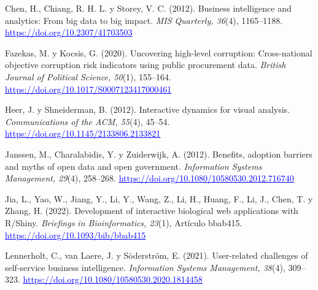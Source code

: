 \documentclass[12pt,a4paper]{article}
\newcommand{\enlace}[2]{\href{#1}{\textcolor{blue}{#2}}}
\begin{document}
\begin{thebibliography}{99}
Chen, H., Chiang, R. H. L. y Storey, V. C. (2012). Business intelligence and analytics: From big data to
big impact. \emph{MIS Quarterly, 36}(4), 1165--1188. \enlace{https://doi.org/10.2307/41703503}{\uline{https:/}\allowbreak \uline{/}\allowbreak \uline{doi.}\allowbreak \uline{org/}\allowbreak \uline{10.}\allowbreak \uline{2307/}\allowbreak \uline{41703503}}

Fazekas, M. y Kocsis, G. (2020). Uncovering high-level corruption: Cross-national objective corruption risk
indicators using public procurement data. \emph{British Journal of Political Science, 50}(1), 155--164.
\enlace{https://doi.org/10.1017/S0007123417000461}{\uline{https:/}\allowbreak \uline{/}\allowbreak \uline{doi.}\allowbreak \uline{org/}\allowbreak \uline{10.}\allowbreak \uline{1017/}\allowbreak \uline{S0007123417000461}}

Heer, J. y Shneiderman, B. (2012). Interactive dynamics for visual analysis. \emph{Communications of the
ACM, 55}(4), 45--54. \enlace{https://doi.org/10.1145/2133806.2133821}{\uline{https:/}\allowbreak \uline{/}\allowbreak \uline{doi.}\allowbreak \uline{org/}\allowbreak \uline{10.}\allowbreak \uline{1145/}\allowbreak \uline{2133806.}\allowbreak \uline{2133821}}

Janssen, M., Charalabidis, Y. y Zuiderwijk, A. (2012). Benefits, adoption barriers and myths of open data
and open government. \emph{Information Systems Management, 29}(4), 258--268.
\enlace{https://doi.org/10.1080/10580530.2012.716740}{\uline{https:/}\allowbreak \uline{/}\allowbreak \uline{doi.}\allowbreak \uline{org/}\allowbreak \uline{10.}\allowbreak \uline{1080/}\allowbreak \uline{10580530.}\allowbreak \uline{2012.}\allowbreak \uline{716740}}

Jia, L., Yao, W., Jiang, Y., Li, Y., Wang, Z., Li, H., Huang, F., Li, J., Chen, T. y Zhang, H. (2022).
Development of interactive biological web applications with R/Shiny. \emph{Briefings in Bioinformatics,
23}(1), Artículo bbab415. \enlace{https://doi.org/10.1093/bib/bbab415}{\uline{https:/}\allowbreak \uline{/}\allowbreak \uline{doi.}\allowbreak \uline{org/}\allowbreak \uline{10.}\allowbreak \uline{1093/}\allowbreak \uline{bib/}\allowbreak \uline{bbab415}}

Lennerholt, C., van Laere, J. y Söderström, E. (2021). User-related challenges of self-service business
intelligence. \emph{Information Systems Management, 38}(4), 309--323.
\enlace{https://doi.org/10.1080/10580530.2020.1814458}{\uline{https:/}\allowbreak \uline{/}\allowbreak \uline{doi.}\allowbreak \uline{org/}\allowbreak \uline{10.}\allowbreak \uline{1080/}\allowbreak \uline{10580530.}\allowbreak \uline{2020.}\allowbreak \uline{1814458}}


\end{thebibliography}
\end{document}
